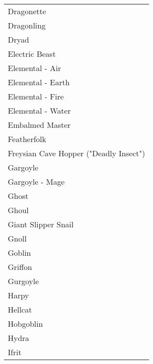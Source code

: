 \documentclass[twoside]{book}
\begin{document}
\begin{longtable}{p{1.25in}}
  \raggedright
           Dragonette 
  \tabularnewline
      
  \raggedright
           Dragonling 
  \tabularnewline
      
  \raggedright
           Dryad 
  \tabularnewline
      
  \raggedright
           Electric Beast 
  \tabularnewline
      
  \raggedright
           Elemental - Air 
  \tabularnewline
      
  \raggedright
           Elemental - Earth 
  \tabularnewline
      
  \raggedright
           Elemental - Fire 
  \tabularnewline
      
  \raggedright
           Elemental - Water 
  \tabularnewline
      
  \raggedright
           Embalmed Master 
  \tabularnewline
      
  \raggedright
           Featherfolk 
  \tabularnewline
      
  \raggedright
           Freysian Cave Hopper ("Deadly
           Insect") 
  \tabularnewline
      
  \raggedright
           Gargoyle 
  \tabularnewline
      
  \raggedright
           Gargoyle - Mage 
  \tabularnewline
      
  \raggedright
           Ghost 
  \tabularnewline
      
  \raggedright
           Ghoul 
  \tabularnewline
      
  \raggedright
           Giant Slipper Snail 
  \tabularnewline
      
  \raggedright
           Gnoll 
  \tabularnewline
      
  \raggedright
           Goblin 
  \tabularnewline
      
  \raggedright
           Griffon 
  \tabularnewline
      
  \raggedright
           Gurgoyle 
  \tabularnewline
      
  \raggedright
           Harpy 
  \tabularnewline
      
  \raggedright
           Hellcat 
  \tabularnewline
      
  \raggedright
           Hobgoblin 
  \tabularnewline
      
  \raggedright
           Hydra 
  \tabularnewline
      
  \raggedright
           Ifrit 
  \tabularnewline
      

\end{longtable}
\end{document}
